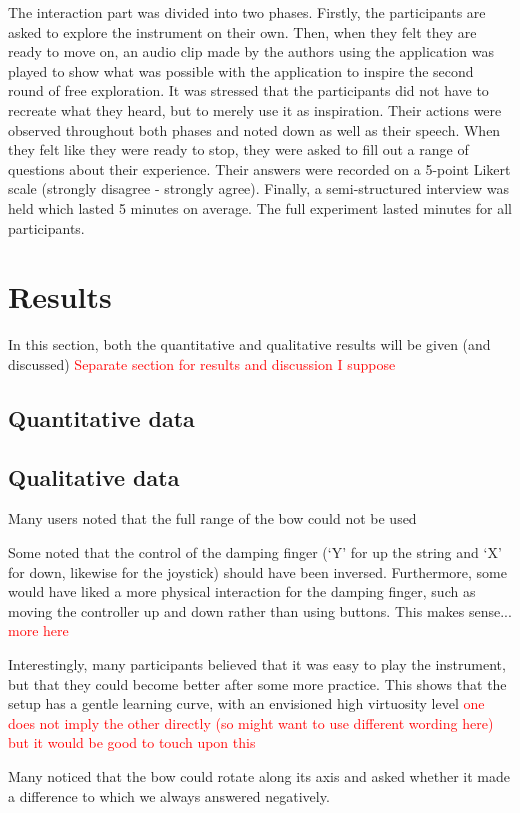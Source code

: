 \documentclass[dvipsnames, pdftex]{article}
\def\SWcomment[#1]{\textcolor{Red}{#1}}
\begin{document}
The interaction part was divided into two phases. Firstly, the participants are asked to explore the instrument on their own. Then, when they felt they are ready to move on, an audio clip made by the authors using the application was played to show what was possible with the application to inspire the second round of free exploration. It was stressed that the participants did not have to recreate what they heard, but to merely use it as inspiration. Their actions were observed throughout both phases and noted down as well as their speech. When they felt like they were ready to stop, they were asked to fill out a range of questions about their experience. Their answers were recorded on a 5-point Likert scale (strongly disagree - strongly agree). Finally, a semi-structured interview was held which lasted 5 minutes on average. The full experiment lasted  minutes for all participants.

\section{Results}
In this section, both the quantitative and qualitative results will be given (and discussed) \SWcomment[Separate section for results and discussion I suppose]
\subsection{Quantitative data}
\subsection{Qualitative data}
Many users noted that the full range of the bow could not be used

Some noted that the control of the damping finger (`Y' for up the string and `X' for down, likewise for the joystick) should have been inversed. Furthermore, some would have liked a more physical interaction for the damping finger, such as moving the controller up and down rather than using buttons. This makes sense... \SWcomment[more here]

Interestingly, many participants believed that it was easy to play the instrument, but that they could become better after some more practice. This shows that the setup has a gentle learning curve, with an envisioned high virtuosity level \SWcomment[one does not imply the other directly (so might want to use different wording here) but it would be good to touch upon this]

Many noticed that the bow could rotate along its axis and asked whether it made a difference to which we always answered negatively. 
\end{document}
